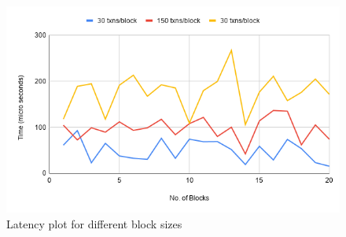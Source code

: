 \begin{figure}[!h]
    \centering
    \includegraphics[scale=0.6]{images/4_block_size.png}
    \caption{Latency plot for different block sizes}
    \label{fig:4_batchsize}
\end{figure}
\clearpage
